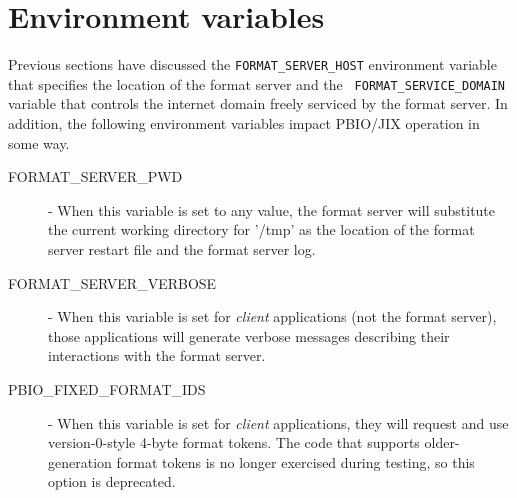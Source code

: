 \documentclass{article}
\begin{document}
\section{Environment variables}
Previous sections have discussed the {\tt FORMAT\_SERVER\_HOST} environment
variable that specifies the location of the format server and the {\tt
FORMAT\_SERVICE\_DOMAIN} variable that controls the internet domain freely
serviced by the format server.  In addition, the following environment
variables impact PBIO/JIX operation in some way.
\begin{description}
\item[FORMAT\_SERVER\_PWD] - When this variable is set to any value, the
format server will substitute the current working directory for '/tmp' as
the location of the format server restart file and the format server log.
\item[FORMAT\_SERVER\_VERBOSE] - When this variable is set for {\it client}
applications (not the format server), those applications will generate
verbose messages describing their interactions with the format server.
\item[PBIO\_FIXED\_FORMAT\_IDS] - When this variable is set for {\it client}
applications, they will request and use version-0-style 4-byte format
tokens.  The code that supports older-generation format tokens is no longer
exercised during testing, so this option is deprecated.
\end{description}
\end{document}
